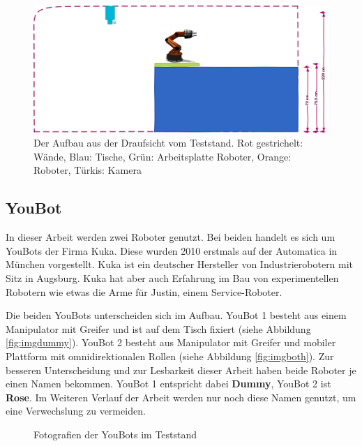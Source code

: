  
 
  \begin{figure}[h]
  	\centering
  	\includegraphics[scale=0.4]{fig/ZeichnungRaumH}   
  	\caption[Aufbau Teststand: Seitenansicht]{Der Aufbau aus der Draufsicht vom Teststand. Rot gestrichelt: Wände, Blau: Tische, Grün: Arbeitsplatte Roboter, Orange: Roboter, Türkis: Kamera}
  	\label{fig:basic-aufbau-teststandh}
  \end{figure}

\subsection{YouBot}
In dieser Arbeit werden zwei Roboter genutzt. Bei beiden handelt es sich um YouBots der Firma Kuka. Diese wurden 2010 erstmals auf der Automatica in München vorgestellt. Kuka ist ein deutscher Hersteller von Industrierobotern mit Sitz in Augsburg. Kuka hat aber auch Erfahrung im Bau von experimentellen Robotern wie etwas die Arme für Justin, einem Service-Roboter.

Die beiden YouBots unterscheiden sich im Aufbau. YouBot 1 besteht aus einem Manipulator mit Greifer und ist auf dem Tisch fixiert (siehe Abbildung \ref{fig:imgdummy}). YouBot 2 besteht aus Manipulator mit Greifer und mobiler Plattform mit omnidirektionalen Rollen (siehe Abbildung \ref{fig:imgboth}). Zur besseren Unterscheidung und zur Lesbarkeit dieser Arbeit haben beide Roboter je einen Namen bekommen. YouBot 1 entspricht dabei \textbf{Dummy}, YouBot 2 ist \textbf{Rose}. Im Weiteren Verlauf der Arbeit werden nur noch diese Namen genutzt, um eine Verwechslung zu vermeiden.

 \begin{figure}[H]
 	\centering
 	\hfill
 	\caption{Fotografien der YouBots im Teststand}
 	\label{fig:img}
 \end{figure}



